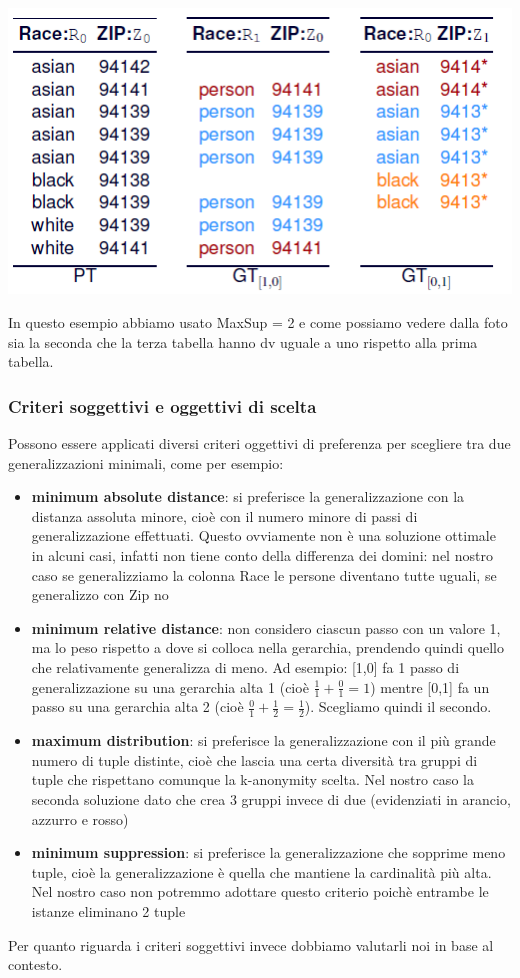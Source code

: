\begin{center}
    \includegraphics[scale=0.7]{img/maxsup.png}
\end{center}
In questo esempio abbiamo usato MaxSup = 2 e come possiamo vedere dalla foto sia la seconda che la terza tabella hanno dv uguale a uno rispetto alla prima tabella.

\subsubsection{Criteri soggettivi e oggettivi di scelta}
Possono essere applicati diversi criteri oggettivi di preferenza per scegliere tra due generalizzazioni minimali, come per esempio:
\begin{itemize}
    \item \textbf{minimum absolute distance}: si preferisce la generalizzazione con la distanza assoluta minore, cioè con il numero minore di passi di generalizzazione effettuati. Questo ovviamente non è una soluzione ottimale in alcuni casi, infatti non tiene conto della differenza dei domini: nel nostro caso se generalizziamo la colonna Race le persone diventano tutte uguali, se generalizzo con Zip no
    \item\textbf{ minimum relative distance}: non considero ciascun passo con un valore 1, ma lo peso rispetto a dove si colloca nella gerarchia, prendendo quindi quello che relativamente generalizza di meno. Ad esempio: [1,0] fa 1 passo di generalizzazione su una gerarchia alta 1 (cioè \(\frac{1}{1} + \frac{0}{1} = 1 \)) mentre [0,1] fa un passo su una gerarchia alta 2 (cioè \(\frac{0}{1} + \frac{1}{2} = \frac{1}{2}\)). Scegliamo quindi il secondo.
    \item \textbf{maximum distribution}: si preferisce la generalizzazione con il più grande numero di tuple distinte, cioè che lascia una certa diversità tra gruppi di tuple che rispettano comunque la k-anonymity scelta. Nel nostro caso la seconda soluzione dato che crea 3 gruppi invece di due (evidenziati in arancio, azzurro e rosso)
    \item \textbf{minimum suppression}: si preferisce la generalizzazione che sopprime meno tuple, cioè la generalizzazione è quella che mantiene la cardinalità più alta. Nel nostro caso non potremmo adottare questo criterio poichè entrambe le istanze eliminano 2 tuple 
\end{itemize}
Per quanto riguarda i criteri soggettivi invece dobbiamo valutarli noi in base al contesto.
